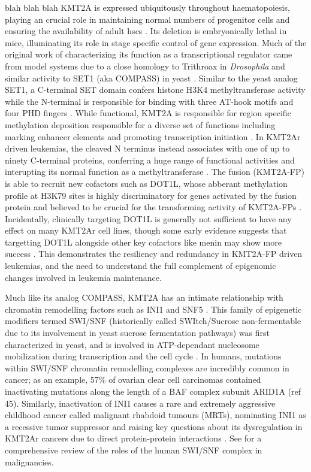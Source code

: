 blah blah blah
%
KMT2A is expressed ubiquitously throughout haematopoiesis, playing an crucial role in maintaining normal numbers of progenitor cells and ensuring the availability of adult \glspl{hsc} \cite{Meyer2017, Antunes2020, Ernst2004} . Its deletion is embryonically lethal in mice, illuminating its role in stage specific control of gene expression. Much of the original work of characterizing its function as a transcriptional regulator came from model systems due to a close homology to Trithroax in \textit{Drosophila} and similar activity to SET1 (aka COMPASS) in yeast \cite{Popovic2005}. Similar to the yeast analog SET1, a C-terminal SET domain confers histone H3K4 methyltransferase activity while the N-terminal is responsible for binding with three AT-hook motifs and four PHD fingers \cite{JJ2003, Hsieh2003}. While functional, KMT2A is responsible for region specific methylation deposition responsible for a diverse set of functions including marking enhancer elements and promoting transcription initiation \cite{Wang2009}. In KMT2Ar driven leukemias, the cleaved N terminus instead associates with one of up to ninety C-terminal proteins, conferring a huge range of functional activities and interupting its normal function as a methyltransferase \cite{Hsieh2003}. The fusion (KMT2A-FP) is able to recruit new cofactors such as DOT1L, whose abberant methylation profile at H3K79 sites is highly discriminatory for genes activated by the fusion protein and believed to be crucial for the transforming activity of KMT2A-FPs \cite{YOkada2005, KMBernt2011}. Incidentally, clinically targeting DOT1L is generally not sufficient to have any effect on many KMT2Ar cell lines, though some early evidence suggests that targetting DOT1L alongside other key cofactors like menin may show more success \cite{Dafflon2016}. This demonstrates the resiliency and redundancy in KMT2A-FP driven leukemias, and the need to understand the full complement of epigenomic changes involved in leukemia maintenance.  

Much like its analog COMPASS, KMT2A has an intimate relationship with chromatin remodelling factors such as INI1 and SNF5 \cite{Cenik2021, Sugeedha2021}. This family of epigenetic modifiers termed SWI/SNF (historically called SWItch/Sucrose non-fermentable due to its involvement in yeast sucrose fermentation pathways) was first characterized in yeast, and is involved in ATP-dependant nucleosome mobilization during transcription and the cell cycle \cite{C2015}. In humans, mutations within SWI/SNF chromatin remodelling complexes are incredibly common in cancer; as an example, 57\% of ovarian clear cell carcinomas contained inactivating mutations along the length of a BAF complex subunit ARID1A (ref 45). Similarly, inactivation of INI1 causes a rare and extremely aggressive childhood cancer called malignant rhabdoid tumours (MRTs), nominating INI1 as a recessive tumor suppressor and raising key questions about its dysregulation in KMT2Ar cancers due to direct protein-protein interactions \cite{I1998}. See \cite{C2015} for a comprehensive review of the roles of the human SWI/SNF complex in malignancies. 


